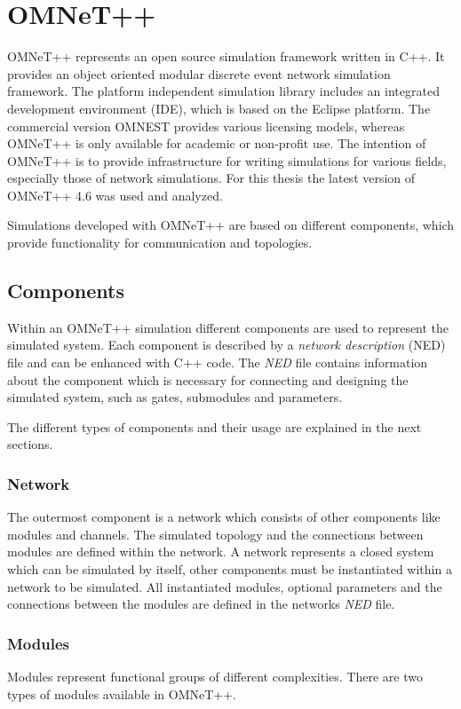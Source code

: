 \chapter{OMNeT++}
\label{cha:omnet}

OMNeT++ represents an open source simulation framework written in C++.
It provides an object oriented modular discrete event network simulation framework.
The platform independent simulation library includes an integrated development environment (IDE), which is based on the Eclipse platform.
The commercial version OMNEST provides various licensing models, whereas OMNeT++ is only available for academic or non-profit use.
The intention of OMNeT++ is to provide infrastructure for writing simulations for various fields, especially those of network simulations.
For this thesis the latest version of OMNeT++ 4.6 was used and analyzed.

Simulations developed with OMNeT++ are based on different components, which provide functionality for communication and topologies.

\section{Components}
\label{sec:omnet_components}
Within an OMNeT++ simulation different components are used to represent the simulated system.
Each component is described by a \emph{network description} (NED) file and can be enhanced with C++ code.
The \emph{NED} file contains information about the component which is necessary for connecting and designing the simulated system, such as gates, submodules and parameters.

The different types of components and their usage are explained in the next sections.

\subsection{Network}
\label{sec:omnet_components_network}
The outermost component is a network which consists of other components like modules and channels.
The simulated topology and the connections between modules are defined within the network.
A network represents a closed system which can be simulated by itself, other components must be instantiated within a network to be simulated.
All instantiated modules, optional parameters and the connections between the modules are defined in the networks \emph{NED} file. \cite[section 3.2.1]{omnet_manual}

\subsection{Modules}
\label{sec:omnet_components_modules}
Modules represent functional groups of different complexities.
There are two types of modules available in OMNeT++.

